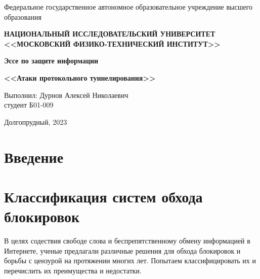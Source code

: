
\newcommand{\boldm}[1]{{\boldsymbol{#1}}}

\usepackage{upgreek}


\begin{center}

    \normalsize{Федеральное государственное автономное образовательное учреждение высшего образования}

    \textbf{НАЦИОНАЛЬНЫЙ ИССЛЕДОВАТЕЛЬСКИЙ УНИВЕРСИТЕТ \\ <<МОСКОВСКИЙ ФИЗИКО-ТЕХНИЧЕСКИЙ ИНСТИТУТ>>}
    \vspace{13ex}

    \textbf{Эссе по защите информации}

    \textbf{<<Атаки протокольного туннелирования>>}
    \vspace{40ex}
\end{center}
\begin{flushright}
    \normalsize{Выполнил: Дурнов Алексей Николаевич \\ студент Б01-009 \\}
\end{flushright}

\vfill

\begin{center}
Долгопрудный, 2023
\end{center}

\thispagestyle{empty} %

\newpage

\section{Введение}
\section{Классификация систем обхода блокировок}
В целях содествия свободе слова и беспрепятственному обмену информацией в Интернете,
ученые предлагали различные решения для обхода блокировок и борьбы с цензурой на протяжении многих лет.
Попытаем классифицировать их и перечислить их преимущества и недостатки.


